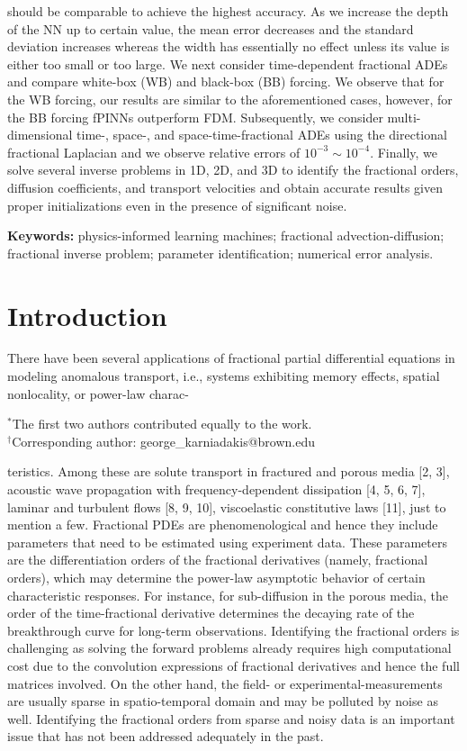\documentclass[UTF8]{article}
\begin{document}
should be comparable to achieve the highest accuracy. As we increase the depth of the NN up to certain value, the mean error decreases and the standard deviation increases whereas the width has essentially no effect unless its value is either too small or too large. We next consider time-dependent fractional ADEs and compare white-box (WB) and black-box (BB) forcing. We observe that for the WB forcing, our results are similar to the aforementioned cases, however, for the BB forcing fPINNs outperform FDM. Subsequently, we consider multi-dimensional time-, space-, and space-time-fractional ADEs using the directional fractional Laplacian and we observe relative errors of $10^{-3} \sim 10^{-4}$. Finally, we solve several inverse problems in 1D, 2D, and 3D to identify the fractional orders, diffusion coefficients, and transport velocities and obtain accurate results given proper initializations even in the presence of significant noise.

\textbf{Keywords:} physics-informed learning machines; fractional advection-diffusion; fractional inverse problem; parameter identification; numerical error analysis.

\section{Introduction}
There have been several applications of fractional partial differential equations in modeling anomalous transport, i.e., systems exhibiting memory effects, spatial nonlocality, or power-law charac-

\hrulefill
\footnotesize{$^*$The first two authors contributed equally to the work. \\ $^\dagger$Corresponding author: george\_karniadakis@brown.edu}

teristics. Among these are solute transport in fractured and porous media [2, 3], acoustic wave propagation with frequency-dependent dissipation [4, 5, 6, 7], laminar and turbulent flows [8, 9, 10], viscoelastic constitutive laws [11], just to mention a few. Fractional PDEs are phenomenological and hence they include parameters that need to be estimated using experiment data. These parameters are the differentiation orders of the fractional derivatives (namely, fractional orders), which may determine the power-law asymptotic behavior of certain characteristic responses. For instance, for sub-diffusion in the porous media, the order of the time-fractional derivative determines the decaying rate of the breakthrough curve for long-term observations. Identifying the fractional orders is challenging as solving the forward problems already requires high computational cost due to the convolution expressions of fractional derivatives and hence the full matrices involved. On the other hand, the field- or experimental-measurements are usually sparse in spatio-temporal domain and may be polluted by noise as well. Identifying the fractional orders from sparse and noisy data is an important issue that has not been addressed adequately in the past.
\end{document}
